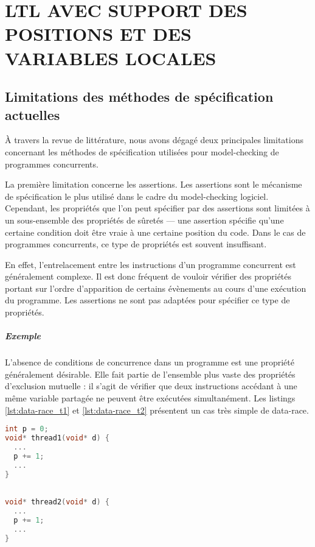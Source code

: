 \chapter{LTL AVEC SUPPORT DES POSITIONS ET DES VARIABLES LOCALES}\label{sec:Theme1}

\section{Limitations des méthodes de spécification actuelles}

À travers la revue de littérature, nous avons dégagé deux principales
limitations concernant les méthodes de spécification utilisées pour
model-checking de programmes concurrents.

La première limitation concerne les assertions. Les assertions sont le mécanisme
de spécification le plus utilisé dans le cadre du model-checking logiciel.
Cependant, les propriétés que l'on peut spécifier par des assertions sont
limitées à un sous-ensemble des propriétés de sûretés --- une assertion spécifie
qu'une certaine condition doit être vraie à une certaine position du code. Dans
le cas de programmes concurrents, ce type de propriétés est souvent insuffisant.

En effet, l'entrelacement entre les instructions d'un programme concurrent est
généralement complexe. Il est donc fréquent de vouloir vérifier des propriétés
portant sur l'ordre d'apparition de certains évènements au cours d'une exécution
du programme. Les assertions ne sont pas adaptées pour spécifier ce type de
propriétés.

\paragraph{Exemple}
L'absence de conditions de concurrence dans un programme est une propriété
généralement désirable. Elle fait partie de l'ensemble plus vaste des propriétés
d'exclusion mutuelle : il s'agit de vérifier que deux instructions accédant à
une même variable partagée ne peuvent être exécutées simultanément. Les listings
\ref{lst:data-race_t1} et \ref{lst:data-race_t2} présentent un cas très simple
de data-race.

\noindent\begin{minipage}{.45\textwidth}
  \begin{lstlisting}[language=C, frame=single, caption=Thread 1,
    label=lst:data-race_t1]
int p = 0;
void* thread1(void* d) {
  ...
  p += 1;
  ...
}
\end{lstlisting}
\end{minipage}\hfill
\begin{minipage}{.45\textwidth}
\begin{lstlisting}[language=C, frame=single, caption=Thread 2,
    label=lst:data-race_t2]

void* thread2(void* d) {
  ...
  p += 1;
  ...
}
\end{lstlisting}
\end{minipage}

